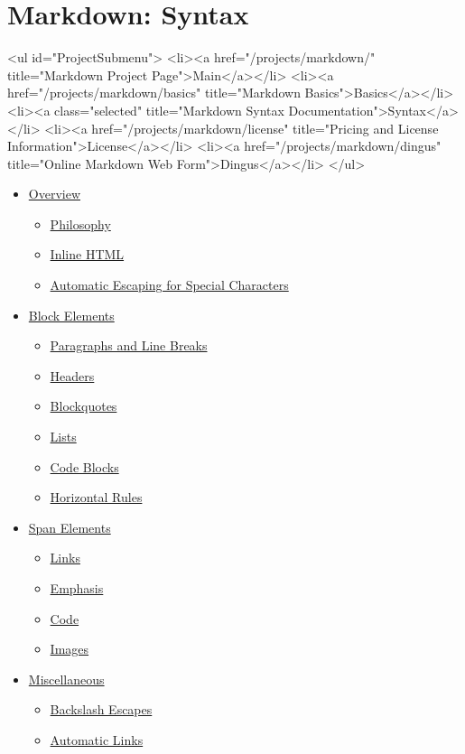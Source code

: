 \section*{Markdown: Syntax}


<ul id="ProjectSubmenu">
    <li><a href="/projects/markdown/" title="Markdown Project Page">Main</a></li>
    <li><a href="/projects/markdown/basics" title="Markdown Basics">Basics</a></li>
    <li><a class="selected" title="Markdown Syntax Documentation">Syntax</a></li>
    <li><a href="/projects/markdown/license" title="Pricing and License Information">License</a></li>
    <li><a href="/projects/markdown/dingus" title="Online Markdown Web Form">Dingus</a></li>
</ul>

\begin{itemize}
\item \href{\#overview}{Overview}\begin{itemize}
\item \href{\#philosophy}{Philosophy}
\item \href{\#html}{Inline HTML}
\item \href{\#autoescape}{Automatic Escaping for Special Characters}
\end{itemize}

\item \href{\#block}{Block Elements}\begin{itemize}
\item \href{\#p}{Paragraphs and Line Breaks}
\item \href{\#header}{Headers}
\item \href{\#blockquote}{Blockquotes}
\item \href{\#list}{Lists}
\item \href{\#precode}{Code Blocks}
\item \href{\#hr}{Horizontal Rules}
\end{itemize}

\item \href{\#span}{Span Elements}\begin{itemize}
\item \href{\#link}{Links}
\item \href{\#em}{Emphasis}
\item \href{\#code}{Code}
\item \href{\#img}{Images}
\end{itemize}

\item \href{\#misc}{Miscellaneous}\begin{itemize}
\item \href{\#backslash}{Backslash Escapes}
\item \href{\#autolink}{Automatic Links}
\end{itemize}

\end{itemize}




